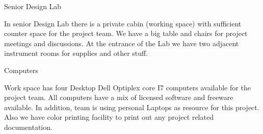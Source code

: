 
{Senior Design Lab}

In senior Design Lab there is a private cabin (working space) with sufficient counter space for the project team. We have a big table and chairs for project meetings and discussions. At the entrance of the Lab we have two adjacent instrument rooms for supplies and other stuff.   


{Computers}

Work space has four Desktop Dell Optiplex core I7 computers available for the project team.  All computers have a mix of licensed software and freeware available. In addition, team is using personal Laptops as resource for this project. Also we have color printing facility to print out any project related documentation.  
 
